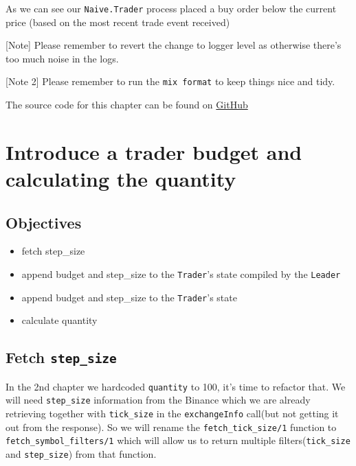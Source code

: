 \documentclass[
  oneside]{book}
\providecommand{\tightlist}{%
  \setlength{\itemsep}{0pt}\setlength{\parskip}{0pt}}
\begin{document}
As we can see our \texttt{Naive.Trader} process placed a buy order below the current price (based on the most recent trade event received)

{[}Note{]} Please remember to revert the change to logger level as otherwise there's too much noise in the logs.

{[}Note 2{]} Please remember to run the \texttt{mix\ format} to keep things nice and tidy.

The source code for this chapter can be found on \href{https://github.com/Cinderella-Man/hands-on-elixir-and-otp-cryptocurrency-trading-bot-source-code/tree/chapter_06}{GitHub}

\chapter{Introduce a trader budget and calculating the quantity}\label{introduce-a-trader-budget-and-calculating-the-quantity}

\section{Objectives}\label{objectives-6}

\begin{itemize}
\tightlist
\item
  fetch step\_size
\item
  append budget and step\_size to the \texttt{Trader}'s state compiled by the \texttt{Leader}
\item
  append budget and step\_size to the \texttt{Trader}'s state
\item
  calculate quantity
\end{itemize}

\section{\texorpdfstring{Fetch \texttt{step\_size}}{Fetch step\_size}}\label{fetch-step_size}

In the 2nd chapter we hardcoded \texttt{quantity} to 100, it's time to refactor that. We will need \texttt{step\_size} information from the Binance which we are
already retrieving together with \texttt{tick\_size} in the \texttt{exchangeInfo} call(but not getting it out from the response). So we will rename the \texttt{fetch\_tick\_size/1} function to \texttt{fetch\_symbol\_filters/1} which will allow us to return multiple filters(\texttt{tick\_size} and \texttt{step\_size}) from that function.
\end{document}
